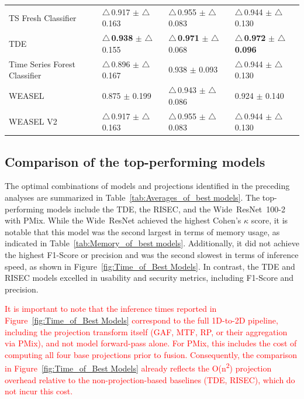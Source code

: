 \documentclass[final,3p,times,twocolumn]{elsarticle}
\newcommand{\red}[1]{\textcolor{red}{#1}}
\begin{document}
\begin{table}[t!]
{\begin{tabular}{llll}
TS Fresh Classifier & $\triangle$\,0.917 $\pm$ $\triangle$\,0.163 & $\triangle$\,0.955 $\pm$ $\triangle$\,0.083 & $\triangle$\,0.944 $\pm$ $\triangle$\,0.130 \\
TDE & \textbf{$\triangle$\,0.938} $\pm$ $\triangle$\,0.155 & \textbf{$\triangle$\,0.971} $\pm$ $\triangle$\,0.068 & \textbf{$\triangle$\,0.972} $\pm$ \textbf{$\triangle$\,0.096} \\
Time Series Forest Classifier & $\triangle$\,0.896 $\pm$ $\triangle$\,0.167 & 0.938 $\pm$ 0.093 & $\triangle$\,0.944 $\pm$ $\triangle$\,0.130 \\
WEASEL & 0.875 $\pm$ 0.199 & $\triangle$\,0.943 $\pm$ $\triangle$\,0.086 & 0.924 $\pm$ 0.140 \\
WEASEL V2 & $\triangle$\,0.917 $\pm$ $\triangle$\,0.163 & $\triangle$\,0.955 $\pm$ $\triangle$\,0.083 & $\triangle$\,0.944 $\pm$ $\triangle$\,0.130 \\
\bottomrule
\end{tabular}

    }
\end{table}














\subsection{Comparison of the top-performing models}


The optimal combinations of models and projections identified in the preceding analyses are summarized in Table~\ref{tab:Averages_of_best models}.
The top-performing models include the \gls{TDE}, the \gls{RISEC}, and the \mbox{Wide ResNet 100-2} with \gls{PMix}.
While the \mbox{Wide ResNet} achieved the highest Cohen's $\kappa$ score, it is notable that this model was the second largest in terms of memory usage, as indicated in Table~\ref{tab:Memory_of_best models}.
Additionally, it did not achieve the highest F1-Score or precision and was the second slowest in terms of inference speed, as shown in Figure~\ref{fig:Time_of_Best Models}.
In contrast, the \gls{TDE} and \gls{RISEC} models excelled in usability and security metrics, including F1-Score and precision.

\red{It is important to note that the inference times reported in Figure~\ref{fig:Time_of_Best Models} correspond to the full 1D-to-2D pipeline, including the projection transform itself (\gls{GAF}, \gls{MTF}, \gls{RP}, or their aggregation via \gls{PMix}), and not model forward-pass alone. For \gls{PMix}, this includes the cost of computing all four base projections prior to fusion. Consequently, the comparison in Figure~\ref{fig:Time_of_Best Models} already reflects the O(n\textsuperscript{2}) projection overhead relative to the non-projection-based baselines (\gls{TDE}, \gls{RISEC}), which do not incur this cost.}
\end{document}
